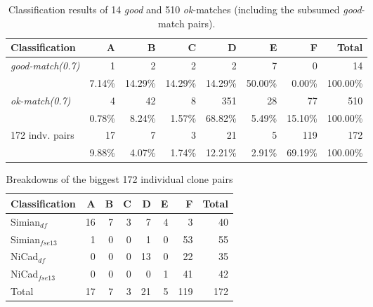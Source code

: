 \documentclass{IEEEtran}
\begin{document}
\begin{table}[H]
	\centering
	\caption{Classification results of 14 \textit{good} and 510 \textit{ok}-matches (including the subsumed \textit{good}-match pairs).}
	\label{tab:classification}
	\begin{tabular}{|l|r|r|r|r|r|r|r|}
		\hline 
		Classification & A & B & C & D & E & F & Total \\ 
		\hline 
		\multirow{2}{*}{\textit{good-match(0.7)}} & 1 & 2 & 2 & 2 & 7 & 0 & 14 \\ \cline{2-8}
		& 7.14\%	& 14.29\%	& 14.29\%	& 14.29\%	& 50.00\%	& 0.00\%	& 100.00\% \\ 
		\hline
		\multirow{2}{*}{\textit{ok-match(0.7)}} & 4 & 42 & 8 & 351 & 28 & 77 & 510 \\ \cline{2-8}
		& 0.78\%	& 8.24\%	&	1.57\%	&	68.82\%	&	5.49\%	&	15.10\%	&	100.00\%  \\ 
		\hline
		\multirow{2}{*}{172 indv. pairs} & 17 & 7 & 3 & 21 & 5 & 119 & 172 \\ \cline{2-8}
		& 9.88\% & 4.07\% & 1.74\% & 12.21\% & 2.91\% & 69.19\% & 100.00\%  \\ 
		\hline
	\end{tabular} 
\end{table}

\begin{table}[H]
	\centering
	\caption{Breakdowns of the biggest 172 individual clone pairs}
	\label{tab:classification_breakdown}
	\begin{tabular}{|l|r|r|r|r|r|r|r|}
		\hline 
		Classification & A & B & C & D & E & F & Total \\ 
		\hline 
		Simian$_{df}$ & 16 & 7 & 3 & 7 & 4 & 3 & 40 \\ 
		\hline
		Simian$_{fse13}$ & 1 & 0 & 0 & 1 & 0 & 53 & 55 \\
		\hline
		NiCad$_{df}$ & 0 & 0 & 0 & 13 & 0 & 22 & 35 \\
		\hline
		NiCad$_{fse13}$ & 0 & 0 & 0 & 0 & 1 & 41 & 42 \\
		\hline
		Total & 17 & 7 & 3 & 21 & 5 & 119 & 172 \\
		\hline
	\end{tabular} 
\end{table}
\end{document}
